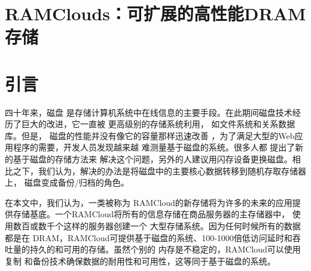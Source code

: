 \documentclass[translation]{zjutreport}
\begin{document}


\frontmatter %

\begingroup %
\let\clearpage\relax %



\titleformat{\chapter}[block]{\sihao\heiti\filcenter\bfseries}{\CJKnumber{\thechapter}}{1ex}{}{} %
\chapter*{RAMClouds：可扩展的高性能DRAM存储}
{} %





\mainmatter%
\chapter{引言}
四十年来，磁盘
是存储计算机系统中在线信息的主要手段。在此期间磁盘技术经历了巨大的改进，它一直被
更高级别的存储系统利用，
如文件系统和关系数据库。但是，
磁盘的性能并没有像它的容量那样迅速改善
，为了满足大型的Web应用程序的需要，开发人员发现越来越
难测量基于磁盘的系统。很多人都
提出了新的基于磁盘的存储方法来
解决这个问题，另外的人建议用​​闪存设备更换磁盘。相比之下，我们认为，解决的办法是将磁盘中的主要核心数据转移到随机存取存储器上，
磁盘变成备份/归档的角色。

在本文中，我们认为，一类被称为
RAMCloud的新存储将为许多的未来的应用提供存储基底。一个RAMCloud将所有的信息存储在商品服务器的主存储器中，
使用数百或数千个这样的服务器创建一个
大型存储系统。因为任何时候所有的数据都是在
DRAM，RAMCloud可提供基于磁盘的系统、100-1000倍低访问延时和吞吐量的持久的和可用的存储。虽然个别的
内存是不稳定的，RAMCloud可以使用复制
和备份技术确保数据的耐用性和可用性，这等同于基于磁盘的系统。
\end{document}
